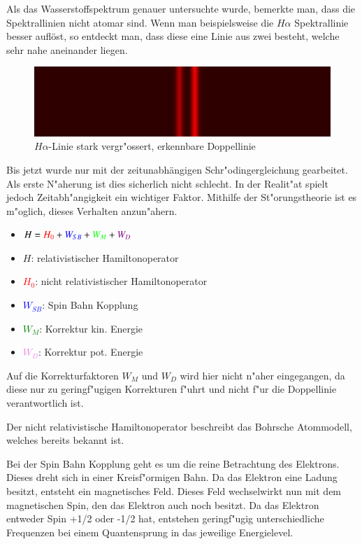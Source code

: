 \begin{refsection}
Als das Wasserstoffspektrum genauer untersuchte wurde, bemerkte man, dass die Spektrallinien nicht atomar sind. Wenn man beispielsweise die $H\alpha$ Spektrallinie besser auflöst, so entdeckt man, dass diese eine Linie aus zwei besteht, welche sehr nahe aneinander liegen. 

\begin{figure}[h!]
	\centering
	\includegraphics[width = .6\columnwidth]{../vortrag/pictures/fine_structure_hydrogen.png}
	\caption{$H\alpha$-Linie stark vergr"ossert, erkennbare Doppellinie} %
\end{figure}

Bis jetzt wurde nur mit der zeitunabhängigen Schr"odingergleichung gearbeitet.
Als erste N"aherung ist dies sicherlich nicht schlecht.
In der Realit"at spielt jedoch Zeitabh"angigkeit ein wichtiger Faktor. 
Mithilfe der St"orungstheorie ist es m"oglich, dieses Verhalten anzun"ahern.

\begin{itemize}
	\item[]  $H = \textcolor{red}{H_0}+ \textcolor{blue}{W_{SB}} + 
		\textcolor{green}{W_M} + \textcolor{violet}{W_D} $
	\item[]  $H$: relativistischer Hamiltonoperator
	\item[]  \textcolor{red}{$H_0$}: nicht relativistischer Hamiltonoperator
	\item[]  \textcolor{blue}{$W_{SB}$}: Spin Bahn Kopplung
	\item[]  \textcolor{green}{$W_M$}: Korrektur kin. Energie
	\item[]  \textcolor{violet}{$W_D$}: Korrektur pot. Energie
	
\end{itemize}
		
Auf die Korrekturfaktoren $W_M$ und $W_D$ wird hier nicht n"aher eingegangen, da diese nur zu geringf"ugigen Korrekturen f"uhrt und nicht f"ur die Doppellinie verantwortlich ist.

Der nicht relativistische Hamiltonoperator beschreibt das Bohrsche  Atommodell, welches bereits bekannt ist.

Bei der Spin Bahn Kopplung geht es um die reine Betrachtung des Elektrons. 
Dieses dreht sich in einer Kreisf"ormigen Bahn. 
Da das Elektron eine Ladung besitzt, entsteht ein magnetisches Feld. 
Dieses Feld wechselwirkt nun mit dem magnetischen Spin, den das Elektron auch noch besitzt. 
Da das Elektron entweder Spin +1/2 oder -1/2 hat, entstehen geringf"ugig unterschiedliche Frequenzen bei einem Quantensprung in das jeweilige Energielevel.


\end{refsection}
